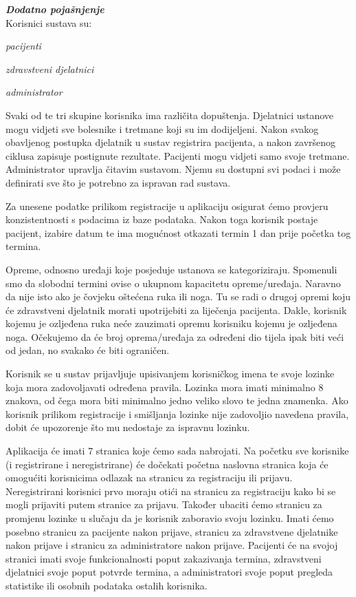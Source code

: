 		\textbf{\textit{Dodatno pojašnjenje}}\\
		
		Korisnici sustava su:
		
		\begin{packed_item}
			\item \textit{pacijenti}
			\item \textit{zdravstveni djelatnici}
			\item \textit{administrator}
		\end{packed_item}
		
		Svaki od te tri skupine korisnika ima različita dopuštenja. Djelatnici ustanove mogu vidjeti sve bolesnike i tretmane koji su im dodijeljeni. Nakon svakog obavljenog postupka djelatnik u sustav registrira pacijenta, a nakon završenog ciklusa zapisuje postignute rezultate. Pacijenti mogu vidjeti samo svoje tretmane. Administrator upravlja čitavim sustavom. Njemu su dostupni svi podaci i može definirati sve što je potrebno za ispravan rad sustava.
		
		Za unesene podatke prilikom registracije u aplikaciju osigurat ćemo provjeru konzistentnosti s podacima iz baze podataka. Nakon toga korisnik postaje pacijent, izabire datum te ima mogućnost otkazati termin 1 dan prije početka tog termina.
		
		Opreme, odnosno uređaji koje posjeduje ustanova se kategoriziraju. Spomenuli smo da slobodni termini ovise o ukupnom kapacitetu opreme/uređaja. Naravno da nije isto ako je čovjeku oštećena ruka ili noga. Tu se radi o drugoj opremi koju će zdravstveni djelatnik morati upotrijebiti za liječenja pacijenta. Dakle, korisnik kojemu je ozljeđena ruka neće zauzimati opremu korisniku kojemu je ozljeđena noga. Očekujemo da će broj oprema/uređaja za određeni dio tijela ipak biti veći od jedan, no svakako će biti ograničen.
		
		Korisnik se u sustav prijavljuje upisivanjem korisničkog imena te svoje lozinke koja mora zadovoljavati određena pravila. Lozinka mora imati minimalno 8 znakova, od čega mora biti minimalno jedno veliko slovo te jedna znamenka. Ako korisnik prilikom registracije i smišljanja lozinke nije zadovoljio navedena pravila, dobit će upozorenje što mu nedostaje za ispravnu lozinku.
		
		Aplikacija će imati 7 stranica koje ćemo sada nabrojati. Na početku sve korisnike (i registrirane i neregistrirane) će dočekati početna naslovna stranica koja će omogućiti korisnicima odlazak na stranicu za registraciju ili prijavu. Neregistrirani korisnici prvo moraju otići na stranicu za registraciju kako bi se mogli prijaviti putem stranice za prijavu. Također ubaciti ćemo stranicu za promjenu lozinke u slučaju da je korisnik zaboravio svoju lozinku. Imati ćemo posebno stranicu za pacijente nakon prijave, stranicu za zdravstvene djelatnike nakon prijave i stranicu za administratore nakon prijave. Pacijenti će na svojoj stranici imati svoje funkcionalnosti poput zakazivanja termina, zdravstveni djelatnici svoje poput potvrde termina, a administratori svoje poput pregleda statistike ili osobnih podataka ostalih korisnika. \\
		
